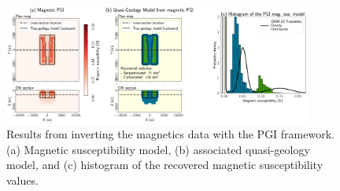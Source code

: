 \begin{figure}[!htb]
    \begin{center}
    \includegraphics[width=0.9\textwidth]{figures/Single-Physics-PGI-Magnetic.png}
    \end{center}
\caption{
    Results from inverting the magnetics data with the PGI framework. (a) Magnetic susceptibility model, (b) associated quasi-geology model, and (c) histogram of the recovered magnetic susceptibility values.
}
\label{fig:single-physics-pgi-magnetics}
\end{figure}
